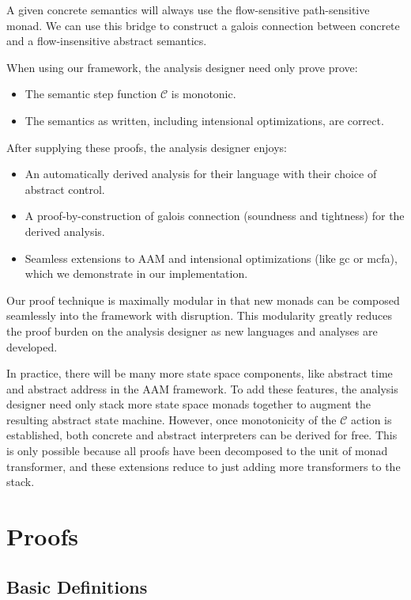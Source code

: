 \documentclass{article}
\begin{document}
A given concrete semantics will always use the flow-sensitive path-sensitive monad.
We can use this bridge to construct a galois connection between concrete and a flow-insensitive abstract semantics.

When using our framework, the analysis designer need only prove prove:
\begin{itemize}
\item The semantic step function $𝒞$ is monotonic.
\item The semantics as written, including intensional optimizations, are correct.
\end{itemize}
After supplying these proofs, the analysis designer enjoys:
\begin{itemize}
\item An automatically derived analysis for their language with their choice of abstract control.
\item A proof-by-construction of galois connection (soundness and tightness) for the derived analysis.
\item Seamless extensions to AAM and intensional optimizations (like gc or mcfa), which we demonstrate in our implementation.
\end{itemize}

Our proof technique is maximally modular in that new monads can be composed seamlessly into the framework with disruption.
This modularity greatly reduces the proof burden on the analysis designer as new languages and analyses are developed.

In practice, there will be many more state space components, like abstract time and abstract address in the AAM framework.
To add these features, the analysis designer need only stack more state space monads together to augment the resulting abstract state machine.
However, once monotonicity of the $𝒞$ action is established, both concrete and abstract interpreters can be derived for free.
This is only possible because all proofs have been decomposed to the unit of monad transformer, and these extensions reduce to just adding more transformers to the stack.



\section{Proofs}
\label{section:Proofs}

\subsection{Basic Definitions}
\label{section:Proofs:BasicDefinitions}
\end{document}
